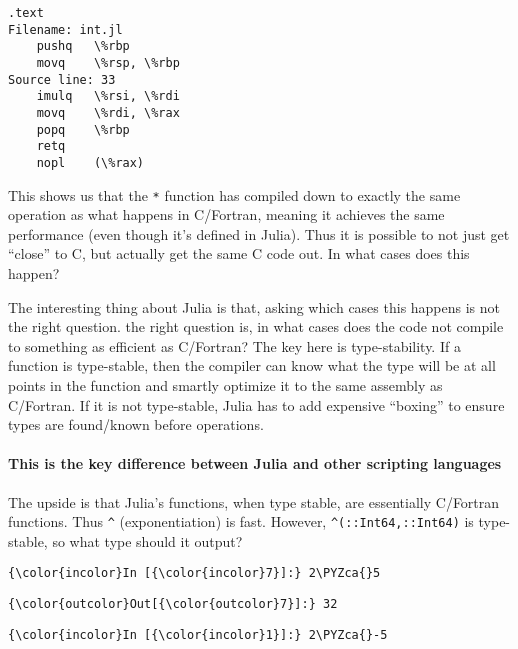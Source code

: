 \documentclass[11pt]{article}
\def\PYZca{\char`\^}
\begin{document}
    \begin{Verbatim}[commandchars=\\\{\}]
	.text
Filename: int.jl
	pushq	\%rbp
	movq	\%rsp, \%rbp
Source line: 33
	imulq	\%rsi, \%rdi
	movq	\%rdi, \%rax
	popq	\%rbp
	retq
	nopl	(\%rax)

    \end{Verbatim}

    This shows us that the \texttt{*} function has compiled down to exactly
the same operation as what happens in C/Fortran, meaning it achieves the
same performance (even though it's defined in Julia). Thus it is
possible to not just get ``close'' to C, but actually get the same C
code out. In what cases does this happen?

The interesting thing about Julia is that, asking which cases this
happens is not the right question. the right question is, in what cases
does the code not compile to something as efficient as C/Fortran? The
key here is type-stability. If a function is type-stable, then the
compiler can know what the type will be at all points in the function
and smartly optimize it to the same assembly as C/Fortran. If it is not
type-stable, Julia has to add expensive ``boxing'' to ensure types are
found/known before operations.

\paragraph{This is the key difference between Julia and other scripting
languages}\label{this-is-the-key-difference-between-julia-and-other-scripting-languages}

The upside is that Julia's functions, when type stable, are essentially
C/Fortran functions. Thus \texttt{\^{}} (exponentiation) is fast.
However, \texttt{\^{}(::Int64,::Int64)} is type-stable, so what type
should it output?

    \begin{Verbatim}[commandchars=\\\{\}]
{\color{incolor}In [{\color{incolor}7}]:} 2\PYZca{}5
\end{Verbatim}

            \begin{Verbatim}[commandchars=\\\{\}]
{\color{outcolor}Out[{\color{outcolor}7}]:} 32
\end{Verbatim}
        
    \begin{Verbatim}[commandchars=\\\{\}]
{\color{incolor}In [{\color{incolor}1}]:} 2\PYZca{}-5
\end{Verbatim}
\end{document}
